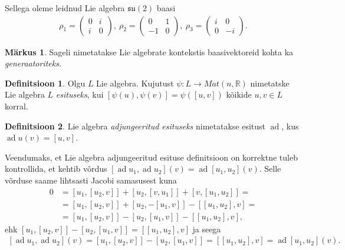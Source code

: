 \documentclass[a4paper,12pt]{article}
\theoremstyle{plain}
\theoremstyle{definition}
\newtheorem{definitsioon}{Definitsioon}[section]
\newtheorem{markus}{Märkus}[section]
\numberwithin{equation}{section}
\DeclareMathOperator{\ad}{ad}
\begin{document}
Sellega oleme leidnud Lie algebra $\mathfrak{su}\left(2\right)$ baasi
\begin{align*}
\rho_1 = \begin{pmatrix} 0 & i \\ i & 0 \end{pmatrix},\ \rho_2 = \begin{pmatrix} 0 & 1 \\ -1 & 0 \end{pmatrix},\ \rho_3 = \begin{pmatrix} i & 0 \\ 0 & -i \end{pmatrix}.
\end{align*}
\begin{markus}
Sageli nimetatakse Lie algebrate kontekstis baasivektoreid kohta ka \emph{generaatoriteks}.
\end{markus}
\begin{definitsioon}
Olgu $L$ Lie algebra. Kujutust $\psi : L \rightarrow Mat\left(n, \mathbb{R}\right)$ nimetatske Lie algebra $L$ \emph{esituseks}, kui $\left[\psi\left(u\right), \psi\left(v\right)\right] = \psi\left(\left[u, v\right]\right)$ kõikide $u, v \in L$ korral. 
\end{definitsioon}

\begin{definitsioon}
Lie algebra \emph{adjungeeritud esituseks} nimetatakse esitust $\ad$, kus $\ad u \left(v\right) = \left[u, v\right]$.
\end{definitsioon}
Veendumaks, et Lie algebra adjungeeritud esituse definitsioon on korrektne tuleb kontrollida, et kehtib võrdus $\left[\ad u_1, \ad u_2 \right] \left(v\right) = \ad \left[u_1, u_2 \right] \left(v\right)$. Selle võrduse saame lihtsasti Jacobi samasusest kuna
\begin{align*}
0 &= \left[ u_1, \left[u_2, v\right] \right] + \left[ u_2, \left[v, u_1 \right] \right] + \left[ v, \left[u_1, u_2\right] \right] = \\
&= \left[ u_1, \left[u_2, v\right] \right] + \left[ u_2, -\left[u_1, v \right] \right] - \left[\left[u_1, u_2\right], v\right] = \\
&= \left[ u_1, \left[u_2, v\right] \right] - \left[ u_2, \left[u_1, v \right] \right] - \left[\left[u_1, u_2\right], v\right],
\end{align*}
ehk $\left[ u_1, \left[u_2, v\right] \right] - \left[ u_2, \left[u_1, v \right] \right] = \left[\left[u_1, u_2\right], v\right]$ ja seega
\begin{align*}
\left[\ad u_1, \ad u_2 \right] \left(v\right) = \left[u_1, \left[u_2, v\right]\right ] - \left[u_2, \left[u_1, v\right]\right] = \left[\left[u_1, u_2\right], v\right] = 
\ad \left[u_1, u_2 \right] \left(v\right).
\end{align*}
\end{document}
